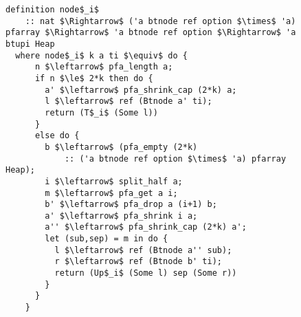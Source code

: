 \begin{figure}
\begin{lstlisting}[mathescape=true, language=Isabelle, label={lst:imp-nodei-fun},
    caption={The imperative node$_i$ function}]
definition node$_i$ 
    :: nat $\Rightarrow$ ('a btnode ref option $\times$ 'a) pfarray $\Rightarrow$ 'a btnode ref option $\Rightarrow$ 'a btupi Heap
  where node$_i$ k a ti $\equiv$ do {
      n $\leftarrow$ pfa_length a;
      if n $\le$ 2*k then do {
        a' $\leftarrow$ pfa_shrink_cap (2*k) a;
        l $\leftarrow$ ref (Btnode a' ti);
        return (T$_i$ (Some l))
      }
      else do {
        b $\leftarrow$ (pfa_empty (2*k)
            :: ('a btnode ref option $\times$ 'a) pfarray Heap);
        i $\leftarrow$ split_half a;
        m $\leftarrow$ pfa_get a i;
        b' $\leftarrow$ pfa_drop a (i+1) b;
        a' $\leftarrow$ pfa_shrink i a; 
        a'' $\leftarrow$ pfa_shrink_cap (2*k) a';
        let (sub,sep) = m in do {
          l $\leftarrow$ ref (Btnode a'' sub);
          r $\leftarrow$ ref (Btnode b' ti);
          return (Up$_i$ (Some l) sep (Some r))
        }
      }
    }

\end{lstlisting}
\end{figure}

